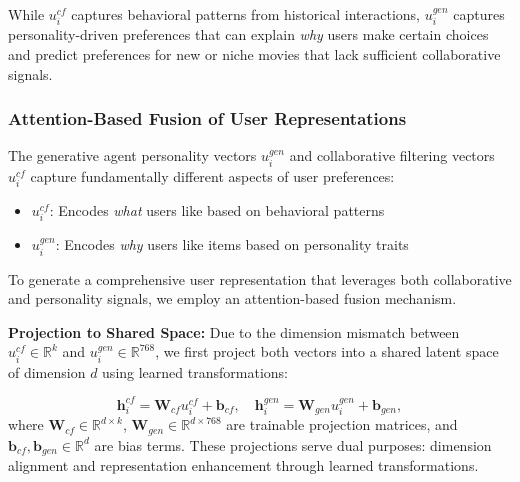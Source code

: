\documentclass[acmsmall]{acmart}
\begin{document}
 While $u^{cf}_i$ captures behavioral patterns from historical interactions, $u^{gen}_i$ captures personality-driven preferences that can explain \textit{why} users make certain choices and predict preferences for new or niche movies that lack sufficient collaborative signals.

\subsubsection{Attention-Based Fusion of User Representations}
\label{sec:attention_fusion}
The generative agent personality vectors $u^{gen}_i$ and collaborative filtering vectors $u^{cf}_i$ capture fundamentally different aspects of user preferences:
\begin{itemize}
    \item $u^{cf}_i$: Encodes \textit{what} users like based on behavioral patterns
    \item $u^{gen}_i$: Encodes \textit{why} users like items based on personality traits
\end{itemize}
To generate a comprehensive user representation that leverages both collaborative and personality signals, we employ an attention-based fusion mechanism.

\textbf{Projection to Shared Space:} Due to the dimension mismatch between $u^{cf}_i \in \mathbb{R}^k$ and $u^{gen}_i \in \mathbb{R}^{768}$, we first project both vectors into a shared latent space of dimension $d$ using learned transformations:

\begin{equation}
\mathbf{h}^{cf}_i = \mathbf{W}_{cf} u^{cf}_i + \mathbf{b}_{cf}, \quad \mathbf{h}^{gen}_i = \mathbf{W}_{gen} u^{gen}_i + \mathbf{b}_{gen},
\label{eq:projection_fusion}
\end{equation}
where $\mathbf{W}_{cf} \in \mathbb{R}^{d \times k}$, $\mathbf{W}_{gen} \in \mathbb{R}^{d \times 768}$ are trainable projection matrices, and $\mathbf{b}_{cf}, \mathbf{b}_{gen} \in \mathbb{R}^d$ are bias terms. These projections serve dual purposes: dimension alignment and representation enhancement through learned transformations.
\end{document}
